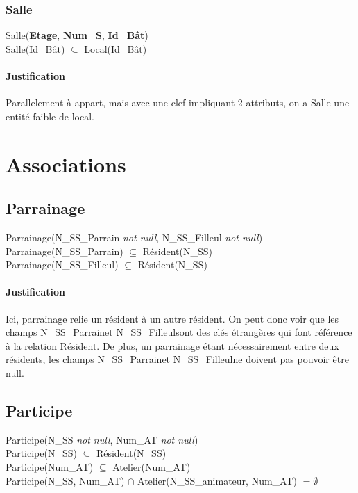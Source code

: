 \documentclass[a4paper, 12pt]{article}
\begin{document}
                \subsubsection{Salle}
                \noindent Salle(\textbf{Etage}, \textbf{Num\_S}, \textbf{Id\_Bât}) \\
                Salle(Id\_Bât) $\subseteq$ Local(Id\_Bât)
                \paragraph{Justification}Parallelement à appart, mais avec une clef impliquant 2 attributs, on a Salle une entité faible de local.
                


    \section{Associations}
        \subsection{Parrainage}
            \noindent Parrainage(N\_SS\_Parrain \textit{not null}, N\_SS\_Filleul \textit{not null}) \\
            Parrainage(N\_SS\_Parrain) $\subseteq$ Résident(N\_SS) \\
            Parrainage(N\_SS\_Filleul) $\subseteq$ Résident(N\_SS)
            \paragraph{Justification}Ici, parrainage relie un résident à un autre résident. On peut donc voir que les champs \og N\_SS\_Parrain\fg et \og N\_SS\_Filleul\fg sont des clés étrangères qui font référence à la relation Résident. De plus, un parrainage étant nécessairement entre deux résidents, les champs \og N\_SS\_Parrain\fg et \og N\_SS\_Filleul\fg ne doivent pas pouvoir être null.
        
        \subsection{Participe}
            \noindent Participe(N\_SS \textit{not null}, Num\_AT \textit{not null}) \\
            Participe(N\_SS) $\subseteq$ Résident(N\_SS) \\
            Participe(Num\_AT) $\subseteq$ Atelier(Num\_AT) \\
            Participe(N\_SS, Num\_AT) $\cap$ Atelier(N\_SS\_animateur, Num\_AT) $= \emptyset$
\end{document}
